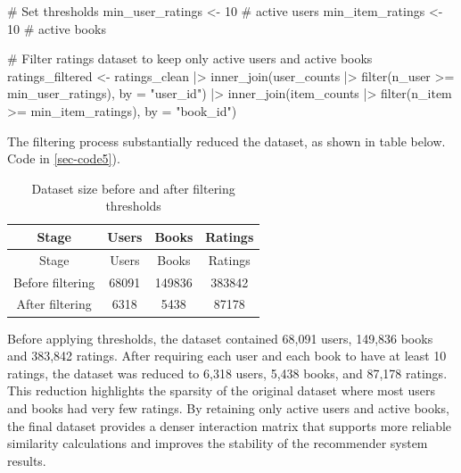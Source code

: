 \documentclass[
  12pt]{article}
\newenvironment{Shaded}{\begin{snugshade}}{\end{snugshade}}
\newcommand{\AttributeTok}[1]{\textcolor[rgb]{0.40,0.45,0.13}{#1}}
\newcommand{\CommentTok}[1]{\textcolor[rgb]{0.37,0.37,0.37}{#1}}
\newcommand{\DecValTok}[1]{\textcolor[rgb]{0.68,0.00,0.00}{#1}}
\newcommand{\FunctionTok}[1]{\textcolor[rgb]{0.28,0.35,0.67}{#1}}
\newcommand{\NormalTok}[1]{\textcolor[rgb]{0.00,0.23,0.31}{#1}}
\newcommand{\OtherTok}[1]{\textcolor[rgb]{0.00,0.23,0.31}{#1}}
\newcommand{\SpecialCharTok}[1]{\textcolor[rgb]{0.37,0.37,0.37}{#1}}
\newcommand{\StringTok}[1]{\textcolor[rgb]{0.13,0.47,0.30}{#1}}
\begin{document}
\begin{Shaded}
\begin{Highlighting}[]
\CommentTok{\# Set thresholds }
\NormalTok{min\_user\_ratings }\OtherTok{\textless{}{-}} \DecValTok{10}   \CommentTok{\# active users}
\NormalTok{min\_item\_ratings }\OtherTok{\textless{}{-}} \DecValTok{10}   \CommentTok{\# active books}

\CommentTok{\# Filter ratings dataset to keep only active users and active books}
\NormalTok{ratings\_filtered }\OtherTok{\textless{}{-}}\NormalTok{ ratings\_clean }\SpecialCharTok{|\textgreater{}}
  \FunctionTok{inner\_join}\NormalTok{(user\_counts }\SpecialCharTok{|\textgreater{}} \FunctionTok{filter}\NormalTok{(n\_user }\SpecialCharTok{\textgreater{}=}\NormalTok{ min\_user\_ratings), }
             \AttributeTok{by =} \StringTok{"user\_id"}\NormalTok{) }\SpecialCharTok{|\textgreater{}}
  \FunctionTok{inner\_join}\NormalTok{(item\_counts }\SpecialCharTok{|\textgreater{}} \FunctionTok{filter}\NormalTok{(n\_item }\SpecialCharTok{\textgreater{}=}\NormalTok{ min\_item\_ratings), }
             \AttributeTok{by =} \StringTok{"book\_id"}\NormalTok{)}
\end{Highlighting}
\end{Shaded}

The filtering process substantially reduced the dataset, as shown in
table below. Code in \ref{sec-code5}).

\begin{longtable}[]{@{}cccc@{}}
\caption{Dataset size before and after filtering
thresholds}\tabularnewline
\toprule\noalign{}
Stage & Users & Books & Ratings \\
\midrule\noalign{}
\endfirsthead
\toprule\noalign{}
Stage & Users & Books & Ratings \\
\midrule\noalign{}
\endhead
\bottomrule\noalign{}
\endlastfoot
Before filtering & 68091 & 149836 & 383842 \\
After filtering & 6318 & 5438 & 87178 \\
\end{longtable}

Before applying thresholds, the dataset contained 68,091 users, 149,836
books and 383,842 ratings. After requiring each user and each book to
have at least 10 ratings, the dataset was reduced to 6,318 users, 5,438
books, and 87,178 ratings. This reduction highlights the sparsity of the
original dataset where most users and books had very few ratings. By
retaining only active users and active books, the final dataset provides
a denser interaction matrix that supports more reliable similarity
calculations and improves the stability of the recommender system
results.
\end{document}
